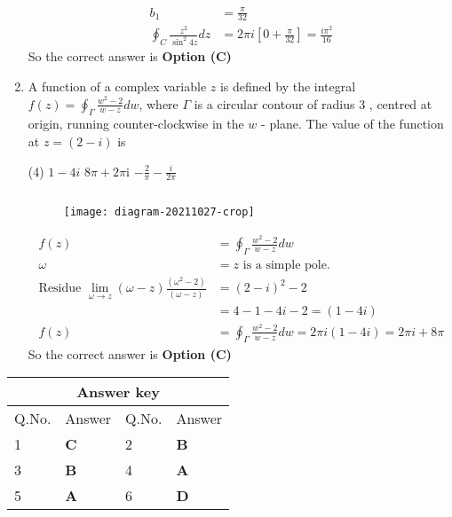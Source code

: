 \begin{note}
\begin{enumerate}[label=\color{ocre}\textbf{\arabic*.}]
\begin{answer}
\begin{align*}
		b_{1}&=\frac{\pi}{32}\\
		\oint_{C} \frac{z^{2}}{\sin ^{2} 4 z} d z&=2 \pi i\left[0+\frac{\pi}{32}\right]=\frac{i \pi^{2}}{16}
		\end{align*}
		So the correct answer is \textbf{Option (C)}
	\end{answer}
	\item  A function of a complex variable $z$ is defined by the integral $f(z)=\oint_{\Gamma} \frac{w^{2}-2}{w-z} d w$, where $\Gamma$ is a circular contour of radius 3 , centred at origin, running counter-clockwise in the $w$ - plane. The value of the function at $z=(2-i)$ is
	{}
	\begin{tasks}(4)
		\task[\textbf{B.}] $1-4 i$
		\task[\textbf{C.}]  $8 \pi+2 \pi \mathrm{i}$
		\task[\textbf{D.}] $-\frac{2}{\pi}-\frac{i}{2 \pi}$
	\end{tasks}
	\begin{answer}$\left. \right. $
		\begin{figure}[H]
			\centering
			\texttt{[image: diagram-20211027-crop]}
		\end{figure}
		\begin{align*}
		f(z)&=\oint_{\Gamma} \frac{w^{2}-2}{w-z} d w\\
		\omega&=z\text{ is a simple pole.}\\
		\text{Residue }\lim _{\omega \rightarrow z}(\omega-z) \frac{\left(\omega^{2}-2\right)}{(\omega-z)}&=(2-i)^{2}-2 \\&=4-1-4 i-2=(1-4 i)\\
		f(z)&=\oint_{\Gamma} \frac{w^{2}-2}{w-z} d w=2 \pi i(1-4 i)=2 \pi i+8 \pi
		\end{align*}
		So the correct answer is \textbf{Option (C)}
	\end{answer}
\end{enumerate}
\setlength\arrayrulewidth{1pt}
\begin{table}[H]
	\centering
	\begin{tabular}{|p{1.5cm}|p{1.5cm}||p{1.5cm}|p{1.5cm}|}
		\hline
		\multicolumn{4}{|c|}{\textbf{Answer key}}\\\hline\hline
		\rowcolor{ocrel}Q.No.&Answer&Q.No.&Answer\\\hline
		1&\textbf{C} &2&\textbf{B}\\\hline 
		3&\textbf{B} &4&\textbf{A} \\\hline
		5&\textbf{A} &6&\textbf{D} \\\hline

\end{tabular}
\end{table}
\end{note}
